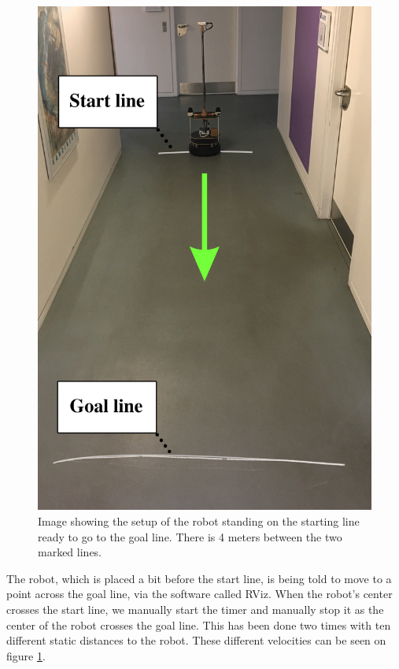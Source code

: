 \begin{figure}[H]
\begin{minipage}[b]{0.57\linewidth}
    \end{minipage}
    \hspace{0.2cm}
    \begin{minipage}[b]{0.4\linewidth}
        \centering
        \includegraphics[width=\textwidth]{figures/velocityTest.png}
        \caption{Image showing the setup of the robot standing on the starting line ready to go to the goal line. There is 4 meters between the two marked lines.}
        \label{fig:test_velocity_setup}
    \end{minipage}
\end{figure}
The robot, which is placed a bit before the start line, is being told to move to a point across the goal line, via the software called RViz. When the robot's center crosses the start line, we manually start the timer and manually stop it as the center of the robot crosses the goal line. This has been done two times with ten different static distances to the robot. These different velocities can be seen on figure \ref{fig:test_velocity_setup}.\\

